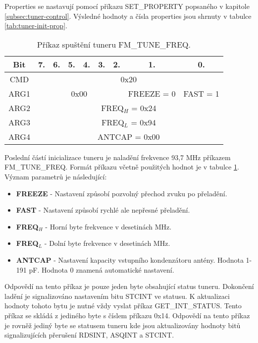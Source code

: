 Properties se nastavují pomocí příkazu SET\_PROPERTY popsaného v kapitole \ref{subsec:tuner-control}. Výsledné hodnoty a čísla properties jsou shrnuty v tabulce \ref{tab:tuner-init-prop}.

\begin{table}[ht!]
\begin{center}
\begin{tabular}{|c|c|c|c|c|c|c|c|c|}
\hline 
Bit & 7. & 6. & 5. & 4. & 3. & 2. & 1. & 0. \\ 
\hline 
CMD & \multicolumn{8}{c|}{0x20} \\ 
\hline 
ARG1 & \multicolumn{6}{c|}{0x00} & FREEZE = 0 & FAST = 1 \\ 
\hline 
ARG2 & \multicolumn{8}{c|}{FREQ$_{{H}}$ = 0x24} \\ 
\hline 
ARG3 & \multicolumn{8}{c|}{FREQ$_{{L}}$ = 0x94} \\ 
\hline 
ARG4 & \multicolumn{8}{c|}{ANTCAP = 0x00} \\ 
\hline 
\end{tabular} 
\end{center}
\caption{Příkaz spuštění tuneru FM\_TUNE\_FREQ.}
\label{tab:tuner-tune-freq} 
\end{table}

Poslední částí inicializace tuneru je naladění frekvence 93,7 MHz příkazem FM\_TUNE\_FREQ. Formát příkazu včetně použitých hodnot je v tabulce \ref{tab:tuner-tune-freq}. Význam parametrů je následující:

\begin{itemize}
\item \textbf{FREEZE} - Nastavení způsobí pozvolný přechod zvuku po přeladění.
\item \textbf{FAST} - Nastavení způsobí rychlé ale nepřesné přeladění.
\item \textbf{FREQ$_{{H}}$} - Horní byte frekvence v desetinách MHz.
\item \textbf{FREQ$_{{L}}$} - Dolní byte frekvence v desetinách MHz.
\item \textbf{ANTCAP} - Nastavení kapacity vstupního kondenzátoru antény. Hodnota 1-191 pF. Hodnota 0 znamená automatické nastavení.
\end{itemize}

Odpovědí na tento příkaz je pouze jeden byte obsahující status tuneru. Dokončení ladění je signalizováno nastavením bitu STCINT ve statusu. K aktualizaci hodnoty tohoto bytu je nutné vždy vyslat příkaz GET\_INT\_STATUS. Tento příkaz se skládá z jediného byte s číslem příkazu 0x14. Odpovědí na tento příkaz je rovněž jediný byte se statusem tuneru kde jsou aktualizovány hodnoty bitů signalizujících přerušení RDSINT, ASQINT a STCINT.


